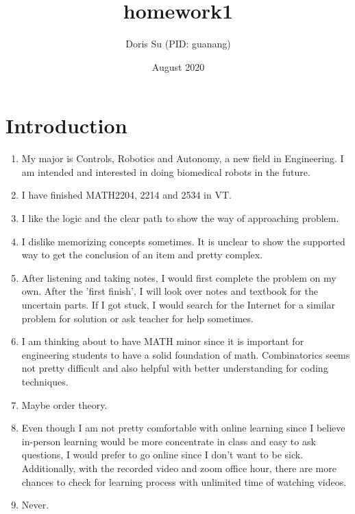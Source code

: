 \documentclass{article}
\title{homework1}
\author{Doris Su (PID: guanang)}
\date{August 2020}
\begin{document}
\maketitle

\section{Introduction}

\renewcommand{\labelenumi}{(\alph{enumi})}

\begin{enumerate}
\item My major is Controls, Robotics and Autonomy, a new field in Engineering. I am intended and interested in doing biomedical robots in the future. 

\item I have finished MATH2204, 2214 and 2534 in VT.

\item I like the logic and the clear path to show the way of approaching problem.

\item I dislike memorizing concepts sometimes. It is unclear to show the supported way to get the conclusion of an item and pretty complex.   

\item After listening and taking notes, I would first complete the problem on my own. After the 'first finish', I will look over notes and textbook for the uncertain parts. If I got stuck, I would search for the Internet for a similar problem for solution or ask teacher for help sometimes. 

\item I am thinking about to have MATH minor since it is important for engineering students to have a solid foundation of math. Combinatorics seems not pretty difficult and also helpful with better understanding for coding techniques. 

\item Maybe order theory. 

\item Even though I am not pretty comfortable with online learning since I believe in-person learning would be more concentrate in class and easy to ask questions, I would prefer to go online since I don't want to be sick. Additionally, with the recorded video and zoom office hour, there are more chances to check for learning process with unlimited time of watching videos.

\item Never.


\end{enumerate}
\end{document}
